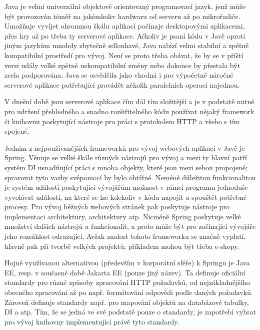 		Java je velmi univerzální objektově orientovaný programovací jazyk, jenž může být provozován téměř na jakémkoliv
		hardwaru od serveru až po mikrořadiče.
		Umožňuje vyvíjet ohromnou škálu aplikací počínaje desktopovými aplikacemi, přes hry až po třeba ty
		serverové aplikace. \cite{java}
		Ačkoliv je psaní kódu v Javě oproti jiným jazykům mnohdy zbytečně zdlouhavé, Java nabízí velmi stabilní
		a zpětně kompatibilní prostředí pro vývoj.
		Není se proto třeba obávat, že by se v příští verzi udály velké zpětně nekompatibilní změny nebo dokonce
		by přestala být zcela podporována.
		Java se osvědčila jako vhodná i pro výpočetně náročné serverové aplikace potřebující provádět několik paralelních
		operací najednou.

		V dnešní době jsou serverové aplikace čím dál tím složitější a je v podstatě nutné pro udržení
		přehledného a snadno rozšiřitelného kódu používat nějaký framework
		či knihovnu poskytující nástroje pro práci s protokolem \Ac{HTTP} a všeho s tím spojené.

		Jedním z nejpoužívanějších frameworků pro vývoj webových aplikací v Javě je Spring.
		Věnuje se velké škále různých nástrojů pro vývoj a mezi ty hlavní patří systém \Ac{DI} usnadňující práci s
		mnoha objekty, které jsou mezi sebou propojené; spravovat tyto vazby svépomocí by bylo obtížné.
		Neméně důležitou funkcionalitou je systém událostí poskytující vývojářům možnost v rámci programu jednoduše vyvolávat
		události, na které se lze kdekoliv v kódu napojit a spouštět potřebné procesy. \cite{spring_framework_documentation_core}
		Pro vývoj běžných webových stránek pak poskytuje nástroje pro implementaci 
		architektury,   architektury atp. \cite{spring_framework_documentaiton_web}
		Nicméně Spring poskytuje velké množství dalších nástrojů a funkcionalit, a proto může být pro začínající vývojáře
		jeho rozsáhlost odrazující.
		Avšak znalost tohoto frameworku se značně vyplatí, hlavně pak při tvorbě velkých projektů; příkladem mohou být
		třeba e-shopy.

		Hojně využívanou alternativou (především v korporátní sféře) k Springu je Java EE, resp. v současné době
		Jakarta EE (pouze jiný název).
		Ta definuje oficiální standardy pro různé způsoby zpracování \Ac{HTTP} požadavků, od nejzákladnějšího obecného
		zpracování až po např. formátování odpovědi podle daných požadavků.
		Zároveň definuje standardy např. pro mapování objektů na databázové tabulky, \Ac{DI} a atp.
		Tím, že se jedná ve své podstatě pouze o standardy, je zapotřebí vybrat pro vývoj knihovny implementující právě tyto
		standardy. \cite{jakarta_ee}

